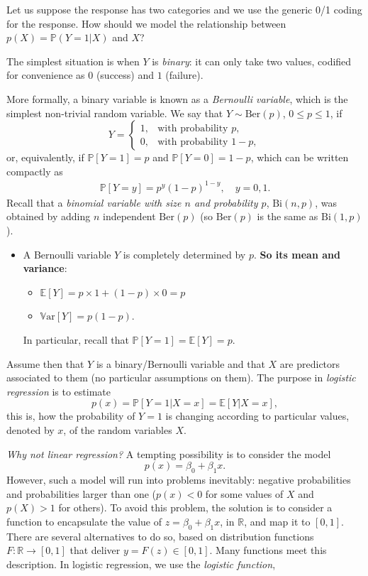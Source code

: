 \documentclass[]{book}
\providecommand{\tightlist}{%
  \setlength{\itemsep}{0pt}\setlength{\parskip}{0pt}}
\newenvironment{rmdblock}[1]
  {\begin{shaded*}
  \begin{itemize}
  \renewcommand{\labelitemi}{
    \raisebox{-.7\height}[0pt][0pt]{
      {\setkeys{Gin}{width=2em,keepaspectratio}\texttt{[image: img/icons/\#1]}}
    }
  }
  \item
  }
  {
  \end{itemize}
  \end{shaded*}
  }
\newenvironment{rmdinsight}
  {\begin{rmdblock}{insight}}
  {\end{rmdblock}}
\begin{document}
Let us suppose the response has two categories and we use the generic
0/1 coding for the response. How should we model the relationship
between \(p(X) = \mathbb{P}(Y = 1|X)\) and \(X\)?

The simplest situation is when \(Y\) is \emph{binary}: it can only take
two values, codified for convenience as \(0\) (success) and \(1\)
(failure).

More formally, a binary variable is known as a \emph{Bernoulli
variable}, which is the simplest non-trivial random variable. We say
that \(Y\sim\mathrm{Ber}(p)\), \(0\leq p\leq1\), if \[
Y=\left\{\begin{array}{ll}1,&\text{with probability }p,\\0,&\text{with probability }1-p,\end{array}\right.
\] or, equivalently, if \(\mathbb{P}[Y=1]=p\) and
\(\mathbb{P}[Y=0]=1-p\), which can be written compactly as
\[\begin{aligned}
\mathbb{P}[Y=y]=p^y(1-p)^{1-y},\quad y=0,1.
\end{aligned}\] Recall that a \emph{binomial variable with size \(n\)
and probability \(p\)}, \(\mathrm{Bi}(n,p)\), was obtained by adding
\(n\) independent \(\mathrm{Ber}(p)\) (so \(\mathrm{Ber}(p)\) is the
same as \(\mathrm{Bi}(1,p)\)).

\begin{rmdinsight}
A Bernoulli variable \(Y\) is completely determined by \(p\). \textbf{So
its mean and variance}:

\begin{itemize}
\tightlist
\item
  \(\mathbb{E}[Y]=p\times1+(1-p)\times0=p\)
\item
  \(\mathbb{V}\mathrm{ar}[Y]=p(1-p)\).
\end{itemize}

In particular, recall that \(\mathbb{P}[Y=1]=\mathbb{E}[Y]=p\).
\end{rmdinsight}

Assume then that \(Y\) is a binary/Bernoulli variable and that \(X\) are
predictors associated to them (no particular assumptions on them). The
purpose in \emph{logistic regression} is to estimate \[
p(x)=\mathbb{P}[Y=1|X=x]=\mathbb{E}[Y|X=x],
\] this is, how the probability of \(Y=1\) is changing according to
particular values, denoted by \(x\), of the random variables \(X\).

\emph{Why not linear regression?} A tempting possibility is to consider
the model \[
p(x)=\beta_0+\beta_1 x.
\] However, such a model will run into problems inevitably: negative
probabilities and probabilities larger than one (\(p(x) < 0\) for some
values of \(X\) and \(p(X) > 1\) for others). To avoid this problem, the
solution is to consider a function to encapsulate the value of
\(z=\beta_0+\beta_1 x\), in \(\mathbb{R}\), and map it to \([0,1]\).
There are several alternatives to do so, based on distribution functions
\(F:\mathbb{R}\longrightarrow[0,1]\) that deliver \(y=F(z)\in[0,1]\).
Many functions meet this description. In logistic regression, we use the
\emph{logistic function},
\end{document}
